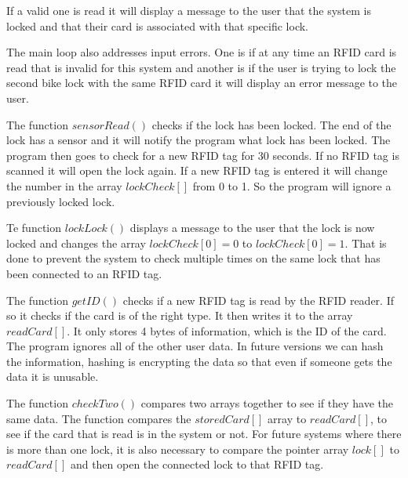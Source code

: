If a valid one is read it will display a message to the user that the system is locked and that their card is associated with that specific lock.


The main loop also addresses input errors. One is if at any time an RFID card is read that is invalid for this system and another is if the user is trying to lock the second bike lock with the same RFID card it will display an error message to the user.

\clearpage




The function $sensorRead()$ checks if the lock has been locked. The end of the lock has a sensor and it will notify the program what lock has been locked. The program then goes to check for a new RFID tag for 30 seconds. If no RFID tag is scanned it will open the lock again. If a new RFID tag is entered it will change the number in the array $lockCheck[]$ from 0 to 1. So the program will ignore a previously locked lock.






Te function $lockLock()$ displays a message to the user that the lock is now locked and changes the array $lockCheck[0]=0$ to $lockCheck[0]=1$. That is done to prevent the system to check multiple times on the same lock that has been connected to an RFID tag.





The function $getID()$ checks if a new RFID tag is read by the RFID reader. If so it checks if the card is of the right type. It then writes it to the array $readCard[]$. It only stores 4 bytes of information, which is the ID of the card. The program ignores all of the other user data. In future versions we can hash the information, hashing is encrypting the data so that even if someone gets the data it is unusable.
  




The function $checkTwo()$ compares two arrays together to see if they have the same data. The function compares the $storedCard[]$ array to $readCard[]$, to see if the card that is read is in the system or not. For future systems where there is more than one lock, it is also necessary to compare the pointer array $lock[]$ to $readCard[]$ and then open the connected lock to that RFID tag.

